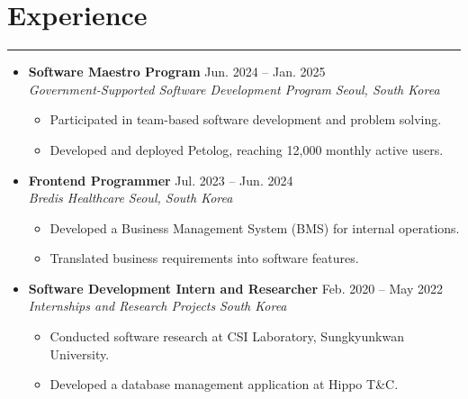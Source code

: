 \documentclass[letterpaper,10pt]{article}
\begin{document}
\section*{Experience}
\hrule
\vspace{4pt}
\begin{itemize}

    \item[]
        \textbf{Software Maestro Program} \hfill Jun. 2024 -- Jan. 2025 \\
        \textit{Government-Supported Software Development Program}
        \hfill \textit{Seoul, South Korea}
        \begin{itemize}
            \item Participated in team-based software development and problem solving.
            \item Developed and deployed Petolog, reaching 12,000 monthly active users.
        \end{itemize}

    \item[]
        \textbf{Frontend Programmer} \hfill Jul. 2023 -- Jun. 2024 \\
        \textit{Bredis Healthcare} \hfill \textit{Seoul, South Korea}
        \begin{itemize}
            \item Developed a Business Management System (BMS) for internal operations.
            \item Translated business requirements into software features.
        \end{itemize}

    \item[]
        \textbf{Software Development Intern and Researcher}
        \hfill Feb. 2020 -- May 2022 \\
        \textit{Internships and Research Projects}
        \hfill \textit{South Korea}
        \begin{itemize}
            \item Conducted software research at CSI Laboratory, Sungkyunkwan University.
            \item Developed a database management application at Hippo T\&C.
        \end{itemize}

\end{itemize}

\end{document}
